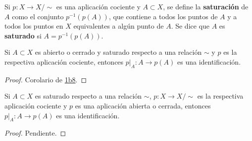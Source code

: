 

\begin{definition}
Si $p : X \longrightarrow X/\sim$ es una aplicación cociente y $A \subset X$, se define la \textbf{saturación} de $A$ como el conjunto $p^{-1}(p(A))$, que contiene a todos los puntos de $A$ y a todos los puntos en $X$ equivalentes a algún punto de $A$. Se dice que $A$ es \textbf{saturado} si $A = p^{-1}(p(A))$.
\end{definition}

\begin{proposition}
Si $A \subset X$ es abierto o cerrado y saturado respecto a una relación $\sim$ y $p$ es la respectiva aplicación cociente, entonces $p|_A : A \longrightarrow p(A)$ es una identificación.
\end{proposition}

\begin{proof}
Corolario de \hyperref[card:1b8]{\textsf{1b8}}.
\end{proof}

\begin{proposition}
Si $A \subset X$ es saturado respecto a una relación $\sim$, $p : X \longrightarrow X/\sim$ es la respectiva aplicación cociente y $p$ es una aplicación abierta o cerrada, entonces $p|_A : A \longrightarrow p(A)$ es una identificación.
\end{proposition}

\begin{proof}
Pendiente.
\end{proof}
